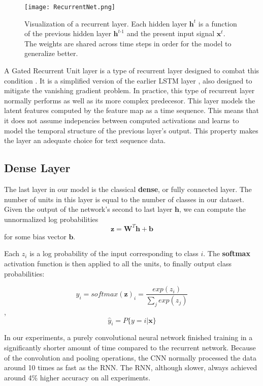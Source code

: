\begin{figure}[H]
\centering
\texttt{[image: RecurrentNet.png]}
\caption{Visualization of a recurrent layer. Each hidden layer $\bm{h}^{\textit{t}}$ is a function of the previous hidden
layer $\bm{h}^{\textit{t-1}}$ and the present input signal $\bm{x}^{\textit{t}}$. The weights are shared across time steps
in order for the model to generalize better.}
\end{figure}

A Gated Recurrent Unit layer is a type of recurrent layer designed to combat this condition \cite{chung2014empirical}.
It is a simplified version of the earlier LSTM layer \cite{hochreiter1997long}, also designed to mitigate the vanishing gradient problem.
In practice, this type of recurrent layer normally performs as well as its more complex predecesor.
This layer models the latent features computed by the feature map as a time sequence. This means that it
does not assume indepencies between computed activations and learns to model the temporal structure of the previous
layer's output. This property makes the layer an adequate choice for text sequence data.

\subsection{Dense Layer}
The last layer in our model is the classical \textbf{dense}, or fully connected layer.
The number of units in this layer is equal to the number of classes in our dataset.
Given the output of the network's second to last layer $\bm{h}$, we can compute the unnormalized log probabilities
\[\bm{z} = \bm{W}^{T}\bm{h} + \bm{b}\]
for some bias vector $\bm{b}$.



Each  $z_i$ is a log probability of the input corresponding to class $i$. The \textbf{softmax} activation function is then applied to
all the units, to finally output class probabilities:

\[\hat{y}_i = softmax(\bm{z})_i = \frac{exp(z_i)}{\sum_j exp(z_j)}\],
\[\hat{y}_i = P\{y=i|\bm{x}\}\]

In our experiments, a purely convolutional neural network finished training in a significantly shorter amount of time compared to the recurrent network.
Because of the convolution and pooling operations, the CNN normally processed the data around 10 times as fast as the RNN. The RNN, although slower,
always achieved around 4\% higher accuracy on all experiments.

